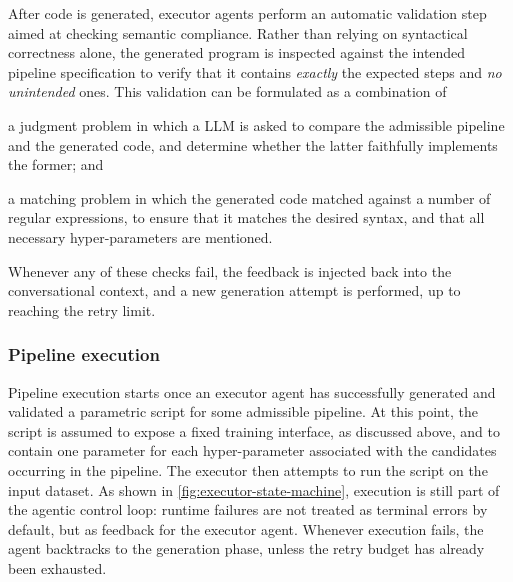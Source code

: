 \documentclass[runningheads]{llncs}
\newenvironment{inlinelist}{\begin{enumerate*}[label=\emph{(\roman*)}]}{\end{enumerate*}}
\begin{document}
After code is generated,
executor agents perform an automatic validation step aimed at checking semantic compliance.
%
Rather than relying on syntactical correctness alone,
the generated program is inspected against the intended pipeline specification
to verify that it contains \emph{exactly} the expected steps and \emph{no unintended} ones.
%
This validation can be formulated as a combination of
\begin{inlinelist}
  \item a judgment problem in which a \ac{LLM} is asked to compare
  the admissible pipeline and the generated code,
  and determine whether the latter faithfully implements the former\footnotemark;
  and
  \item a matching problem in which the generated code matched against a number of regular expressions,
  to ensure that it matches the desired syntax,
  and that all necessary hyper-parameters are mentioned.
\end{inlinelist}
%
%
Whenever any of these checks fail,
the feedback is injected back into the conversational context,
and a new generation attempt is performed,
up to reaching the retry limit.


\subsubsection{Pipeline execution}

Pipeline execution starts once an executor agent has successfully generated
and validated a parametric script for some admissible pipeline.
%
At this point,
the script is assumed to expose a fixed training interface,
as discussed above,
and to contain one parameter for each hyper-parameter associated with the candidates occurring in the pipeline.
%
The executor then attempts to run the script on the input dataset.
%
As shown in \cref{fig:executor-state-machine},
execution is still part of the agentic control loop:
runtime failures are not treated as terminal errors by default,
but as feedback for the executor agent.
%
Whenever execution fails,
the agent backtracks to the generation phase,
unless the retry budget has already been exhausted.
%
\end{document}
